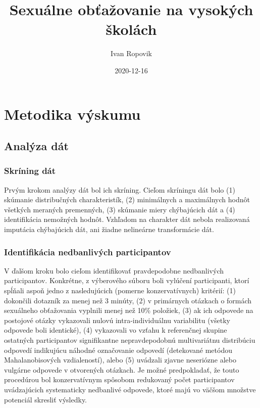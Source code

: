 \documentclass[
]{article}
\title{Sexuálne obťažovanie na vysokých školách}
\author{Ivan Ropovik}
\date{2020-12-16}
\begin{document}
\maketitle

{
\setcounter{tocdepth}{2}
\tableofcontents
}
\newpage

\hypertarget{metodika-vuxfdskumu}{%
\section{Metodika výskumu}\label{metodika-vuxfdskumu}}

\hypertarget{analyza-dat}{%
\subsection{Analýza dát}\label{analyza-dat}}

\hypertarget{skruxedning-duxe1t}{%
\subsubsection{Skríning dát}\label{skruxedning-duxe1t}}

Prvým krokom analýzy dát bol ich skríning. Cieľom skríningu dát bolo (1) skúmanie distribučných charakteristík, (2) minimálnych a maximálnych hodnôt všetkých meraných premenných, (3) skúmanie miery chýbajúcich dát a (4) identifikácia nemožných hodnôt. Vzhľadom na charakter dát nebola realizovaná imputácia chýbajúcich dát, ani žiadne nelineárne transformácie dát.

\hypertarget{identifikuxe1cia-nedbanlivuxfdch-participantov}{%
\subsubsection{Identifikácia nedbanlivých participantov}\label{identifikuxe1cia-nedbanlivuxfdch-participantov}}

V ďalšom kroku bolo cieľom identifikovať pravdepodobne nedbanlivých participantov. Konkrétne, z výberového súboru boli vylúčení participanti, ktorí spĺňali aspoň jedno z nasledujúcich (pomerne konzervatívnych) kritérií: (1) dokončili dotazník za menej než 3 minúty, (2) v primárnych otázkach o formách sexuálneho obťažovania vyplnili menej než 10\% položiek, (3) ak ich odpovede na postojové otázky vykazovali nulovú intra-individuálnu variabilitu (všetky odpovede boli identické), (4) vykazovali vo vzťahu k referenčnej skupine ostatných participantov signifikantne nepravdepodobnú multivariátnu distribúciu odpovedí indikujúcu náhodné označovanie odpovedí (detekované metódou Mahalanobisových vzdialeností), alebo (5) uvádzali zjavne neseriózne alebo vulgárne odpovede v otvorených otázkach. Je možné predpokladať, že touto procedúrou bol konzervatívnym spôsobom redukovaný počet participantov uvádzajúcich systematicky nedbanlivé odpovede, ktoré majú vo väčšom množstve potenciál skresliť výsledky.
\end{document}
